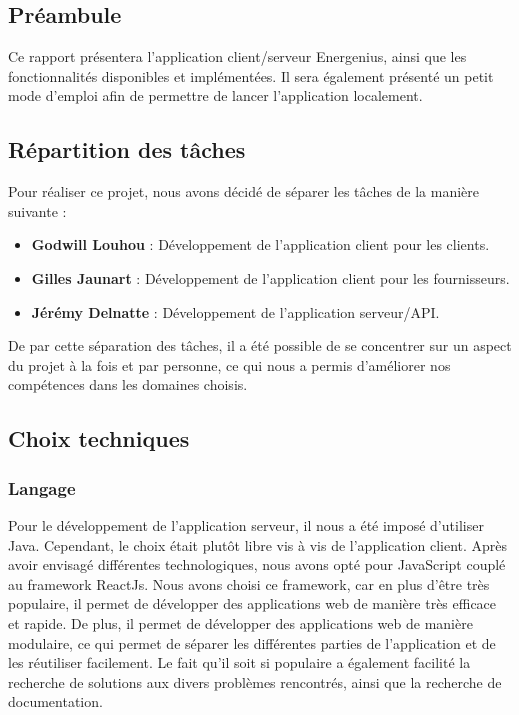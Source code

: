 \documentclass[../rapport.tex]{subfiles}
\begin{document}
\subsection{Préambule}
Ce rapport présentera l'application client/serveur Energenius, ainsi que les fonctionnalités disponibles et implémentées. Il sera également présenté un petit mode d'emploi afin de permettre de lancer l'application localement.

\subsection{Répartition des tâches}
Pour réaliser ce projet, nous avons décidé de séparer les tâches de la manière suivante :
\begin{itemize}
  \item \textbf{Godwill Louhou} : Développement de l'application client pour les clients. 
  \item \textbf{Gilles Jaunart} : Développement de l'application client pour les fournisseurs.
  \item \textbf{Jérémy Delnatte} : Développement de l'application serveur/API.
\end{itemize}

De par cette séparation des tâches, il a été possible de se concentrer sur un aspect du projet à la fois et par personne, ce qui nous a permis d'améliorer nos compétences dans les domaines choisis.

\subsection{Choix techniques}
\subsubsection{Langage}
Pour le développement de l'application serveur, il nous a été imposé d'utiliser Java. Cependant, le choix était plutôt libre vis à vis de l'application client. Après avoir envisagé différentes technologiques, nous avons opté pour JavaScript couplé au framework ReactJs. Nous avons choisi ce framework, car en plus d'être très populaire, il permet de développer des applications web de manière très efficace et rapide. De plus, il permet de développer des applications web de manière modulaire, ce qui permet de séparer les différentes parties de l'application et de les réutiliser facilement. Le fait qu'il soit si populaire a également facilité la recherche de solutions aux divers problèmes rencontrés, ainsi que la recherche de documentation.  
\end{document}
